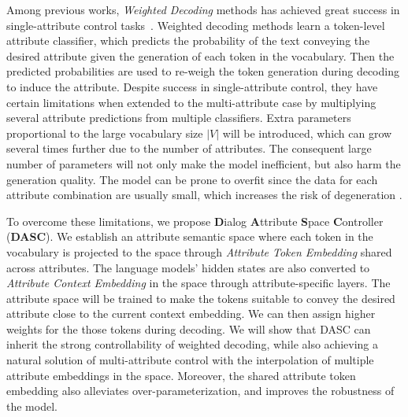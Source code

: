 Among previous works, \textit{Weighted Decoding} methods has achieved great success in single-attribute control tasks~\citep{arora2022director,liu-etal-2022-length}. 
Weighted decoding methods learn a token-level attribute classifier, 
which predicts the probability of the text conveying the desired attribute 
given the generation of each token in the vocabulary. 
Then the predicted probabilities are used to 
re-weigh the token generation during decoding to induce the attribute. 
Despite success in single-attribute 
control, they have certain limitations when extended to the multi-attribute case 
by multiplying several attribute predictions from multiple classifiers. Extra 
parameters proportional to the large vocabulary size $|V|$ will be introduced, 
which can grow several times further due to the number of attributes. 
The consequent large number of parameters will not only make the model inefficient, but also harm the generation quality. The model can be prone to overfit since the data for each attribute combination are usually small, which increases the risk of degeneration \citep{holtzman2019curious}. 

To overcome these limitations, we propose \textbf{D}ialog \textbf{A}ttribute \textbf{S}pace \textbf{C}ontroller (\textbf{DASC}). We establish an attribute semantic space where each token in the vocabulary is projected to the space through \textit{Attribute Token Embedding} shared across attributes. The language models' hidden states are also converted to \textit{Attribute Context Embedding} in the space through attribute-specific layers. The attribute space will be trained to make the tokens suitable to convey the desired attribute close to the current context embedding. We can then assign higher weights for the those tokens during decoding.
We will show that DASC can inherit the strong controllability of weighted decoding, 
while also achieving a natural solution of multi-attribute control with the 
interpolation of multiple attribute embeddings in the space. Moreover, 
the shared attribute token embedding also alleviates over-parameterization, 
and improves the robustness of the model.

